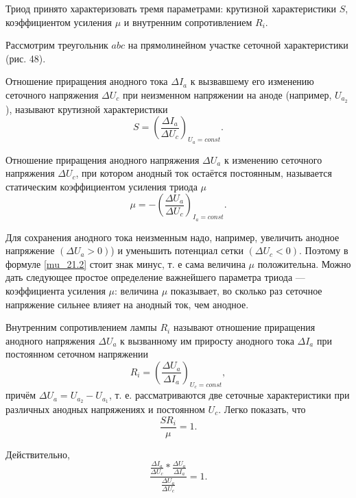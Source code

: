 \documentclass[a4paper,10pt]{book}
\begin{document}
Триод принято характеризовать тремя параметрами: крутизной характеристики $S$, коэффициентом усиления $\mu$ и внутренним сопротивлением $R_i$.

Рассмотрим треугольник $abc$ на прямолинейном участке сеточной характеристики (рис. 48).

Отношение приращения анодного тока $\Delta I_a$ к вызвавшему его изменению сеточного напряжения $\Delta U_c$ при неизменном напряжении на аноде (например, $U_{a_2}$), называют крутизной характеристики
\begin{equation}
S = (\frac{\Delta I_a}{\Delta U_c})_{U_a=const}.
\end{equation}

Отношение приращения анодного напряжения $\Delta U_a$ к изменению сеточного напряжения $\Delta U_c$, при котором анодный ток остаётся постоянным, называется статическим коэффициентом усиления триода $\mu$ \begin{equation}\label{mu_21.2}
\mu = - (\frac{\Delta U_a}{\Delta U_c})_{I_a=const}.
\end{equation}

Для сохранения анодного тока неизменным надо, например, увеличить анодное напряжение $(\Delta U_a > 0)$) и уменьшить потенциал сетки $(\Delta U_c < 0)$. Поэтому в формуле \ref{mu_21.2} стоит знак минус, т. е сама величина $\mu$ положительна. Можно дать следующее простое определение важнейшего параметра триода — коэффициента усиления $\mu$: величина $\mu$ показывает, во сколько раз сеточное напряжение сильнее влияет на анодный ток, чем анодное.

Внутренним сопротивлением лампы $R_i$ называют отношение приращения анодного напряжения $\Delta U_a$ к вызванному им приросту анодного тока $\Delta I_a$ при постоянном сеточном напряжении\begin{equation}\label{21.3}
R_i = (\frac{\Delta U_a}{\Delta I_a})_{U_c=const},
\end{equation}
причём $\Delta U_a = U_{a_2}-U_{a_1}$, т. е. рассматриваются две сеточные характеристики при различных анодных напряжениях и постоянном $U_c$. Легко показать, что\begin{equation}\label{21.4}
\frac{S R_i}{\mu} = 1.
\end{equation}

Действительно, \begin{equation}
\frac{\frac{\Delta I_a}{\Delta U_c}*\frac{\Delta U_a}{\Delta I_a}}{\frac{\Delta U_a}{\Delta U_c}} = 1.\nonumber
\end{equation}
\end{document}
